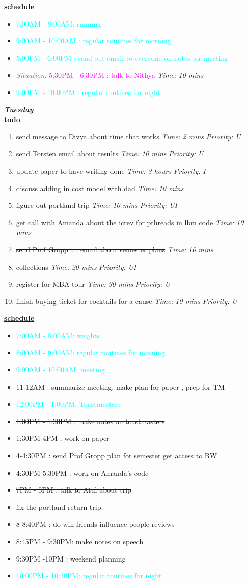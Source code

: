 \documentclass[11pt]{article}
\newcommand{\doneTask}[1]{\item \sout{#1}}
\newcommand{\timeEst}[1]{\textit{Time:} \textit{#1}}
\newcommand{\priority}[1]{\textit{Priority:} \textit{#1}}
\newcommand{\regItem}[1]{\item \textcolor{cyan}{#1}}
\newcommand{\situationItem}[1]{\item \textcolor{magenta}{\textit{Situation:} #1}}
\begin{document}
\underline{\textbf{schedule}}\\
\begin{itemize}
\regItem{7:00AM - 8:00AM: running}
\regItem{9:00AM - 10:00AM : regular routines for morning}
\regItem{5:00PM - 6:00PM : send out email to everyone on notes for meeting}
\situationItem{ 5:30PM - 6:30PM : talk to Nithya} \timeEst{10 mins}
\regItem{9:00PM - 10:00PM : regular routines for night}
\end{itemize}

\underline{\textbf{\textit{Tuesday}}}\\
\underline{\textbf{todo}}\\
\begin{enumerate}
\item send message to Divya about time that works \timeEst{2 mins} \priority{U}
\item send Torsten email about results \timeEst{10 mins}   \priority{U}
\item update paper to have writing done \timeEst{3 hours} \priority{I}
\item discuss adding in cost model with dad \timeEst{10 mins}
\item figure out portland trip \timeEst{10 mins} \priority{UI}
\item get call with Amanda about the icrev for pthreads in lbm code  \timeEst{10 mins}
\doneTask{send Prof Gropp an email about semester plans} \timeEst{10 mins}
\item collections \timeEst{20 mins} \priority{UI}
\item register for MBA tour \timeEst{30 mins} \priority{U}
\item finish buying ticket  for cocktails for a cause \timeEst{10 mins} \priority{U}
\end{enumerate}

\underline{\textbf{schedule}}\\
\begin{itemize}
\regItem{7:00AM - 8:00AM: weights}
\regItem {8:00AM - 9:00AM: regular routines for morning}
\regItem {9:00AM - 10:00AM: meeting}
\item 11-12AM  :  summarize meeting, make plan for paper , prep for TM
\regItem {12:00PM - 1:00PM: Toastmasters}
\doneTask{ 1:00PM - 1:30PM : make notes on toastmasters}
\item 1:30PM-4PM :  work on paper
\item 4-4:30PM : send Prof Gropp plan for semester  get access to BW
\item 4:30PM-5:30PM  : work on Amanda's code
\doneTask{ 7PM - 8PM : talk to Atul about trip}
\item  fix the portland return trip.
\item 8-8:40PM :  do win friends influence people reviews
\item 8:45PM - 9:30PM: make notes on speech
\item 9:30PM -10PM : weekend planning
\regItem {10:00PM - 10:30PM: regular routines for night}
\end{itemize}
\end{document}
